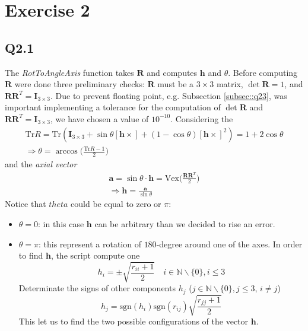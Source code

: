 \section{Exercise 2} \label{P2}

\subsection{Q2.1}
\label{subsec::q12}
The \textit{RotToAngleAxis} function takes $\mathbf{R}$ and computes $\mathbf{h}$ and $\theta$. Before computing $\mathbf{R}$ were done three preliminary checks: $\mathbf{R}$ must be a $3\times 3$ matrix, $\det \mathbf{R} = 1$, and $\mathbf{R}\mathbf{R}^T = \mathbf{I}_{3\times 3}$.
Due to prevent floating point, e.g. Subsection \ref{subsec::q23}, was important implementing a tolerance for the computation of $\det \mathbf{R}$ and $\mathbf{R}\mathbf{R}^T = \mathbf{I}_{3\times 3}$\space, we have chosen a value of $10^{-10}$. Considering the
\begin{gather*}
	\text{Tr} R = \text{Tr}(\mathbf{I}_{3\times 3} + \sin{\theta}[\mathbf{h}\times] + (1 - \cos \theta)[\mathbf{h}\times]^2) = 1 + 2 \cos \theta \\
	\Rightarrow \theta = \arccos \Bigg ( \frac{\text{Tr} R -1}{2} \Bigg )
\end{gather*}
and the \textit{axial vector}
\begin{gather*}
	\mathbf{a} = \sin \theta \cdot \mathbf h = \text{Vex}\Bigg (\frac{\mathbf{R}\mathbf{R}^T}{2} \Bigg ) \\
	\Rightarrow \mathbf{h} = \frac{\mathbf{a}}{\sin \theta}
\end{gather*}
Notice that $theta$ could be equal to zero or $\pi$:
\begin{itemize}
	\item $\theta = 0$: in this case $\mathbf{h}$ can be arbitrary than we decided to rise an error.
	\item $\theta = \pi$: this represent a rotation of $180$-degree around one of the axes. In order to find $\mathbf{h}$, the script compute one
	\begin{equation*}
		h_i = \pm\sqrt{\frac{r_{ii}+1}{2}} \quad i \in \mathbb{N} \smallsetminus \{0\}, i \leq 3
	\end{equation*}
	Determinate the signs of other components $h_j$ ($j \in \mathbb{N} \smallsetminus \{0\}, j \leq 3$, $i\neq j$)
	 \begin{equation*}
	 	h_j = \text{sgn}(h_i) \text{sgn} (r_{ij})\sqrt{\frac{r_{jj}+1}{2}}
	 \end{equation*}
	 This let us to find the two possible configurations of the vector $\mathbf{h}$.
\end{itemize}
